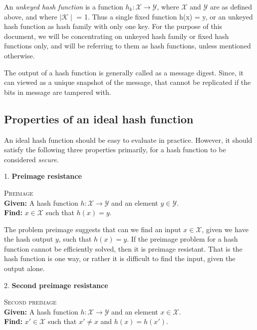An \emph{unkeyed hash function} is a function $h_{k}: \mathcal{X} \to \mathcal{Y}$, where $\mathcal{X}$ and
$\mathcal{Y}$ are as defined above, and where $\mid\mathcal{K}\mid$ = 1. Thus a single fixed function h(x) = y,
or an unkeyed hash function as hash family with only one key. For the purpose of this document, we will
be concentrating on unkeyed hash family or fixed hash functions only, and will be referring to them as
hash functions, unless mentioned otherwise.

The output of a hash function is generally called as a message digest. Since, it can viewed as a unique
snapshot of the message, that cannot be replicated if the bits in message are tampered with.
  
\subsection{Properties of an ideal hash function}
An ideal hash function should be easy to evaluate in practice. However, it should satisfy the following
three properties primarily, for a hash function to be considered \emph{secure}.

1. {\bf Preimage resistance}
\begin{center}
  \framebox
  {
    \parbox{300pt}
    {
      \centering \textsc{Preimage} \\
      {\bf Given:} A hash function $h : \mathcal{X} \to \mathcal{Y}$ and an element $y \in \mathcal{Y}$. \\
      {\bf Find:} $x \in \mathcal{X}$ such that $h(x) = y$. 
    }
  }
\end{center}
\vspace{4mm}

The problem preimage suggests that can we find an input $x \in \mathcal{X}$, given we have the hash 
output $y$, such that $h(x) = y$. If the preimage problem for a hash function cannot be efficiently
solved, then it is preimage resistant. That is the hash function is one way, or rather it is difficult
to find the input, given the output alone.

2. {\bf Second preimage resistance}
\begin{center}
  \framebox
  {
    \parbox{300pt}
    {
      \centering \textsc{Second preimage} \\
      {\bf Given:} A hash function $h : \mathcal{X} \to \mathcal{Y}$ and an element $x \in \mathcal{X}$. \\
      {\bf Find:} $x' \in \mathcal{X}$ such that $x' \neq x$ and $h(x) = h(x')$. 
    }
  }
\end{center}
\vspace{4mm}

